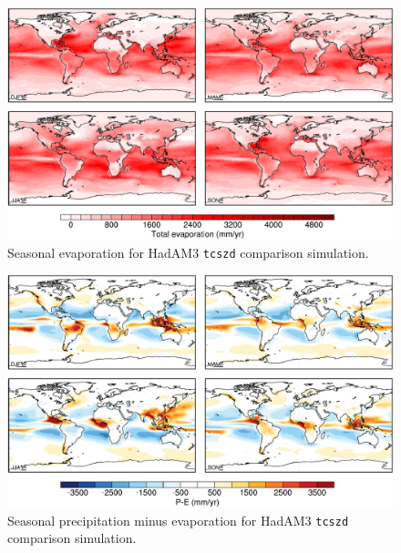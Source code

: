 \documentclass[a4paper,11pt]{article}
\begin{document}
\begin{figure}
  \begin{center}
    \includegraphics[width=\textwidth]{../hadam3-comparison/plots/evap-plots}
  \end{center}
  \caption{Seasonal evaporation for HadAM3 \texttt{tcszd} comparison
    simulation.}
  \label{fig:evap-hadam3}
\end{figure}

\begin{figure}
  \begin{center}
    \includegraphics[width=\textwidth]{../hadam3-comparison/plots/pmine-plots}
  \end{center}
  \caption{Seasonal precipitation minus evaporation for HadAM3
    \texttt{tcszd} comparison simulation.}
  \label{fig:pmine-hadam3}
\end{figure}
\end{document}
